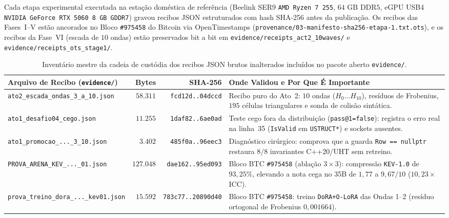 \documentclass[10pt,a4paper]{article}
\begin{document}
Cada etapa experimental executada na esta\c{c}\~ao dom\'estica de refer\^encia (Beelink SER9 \texttt{AMD Ryzen 7 255}, $64\text{ GB DDR5}$, eGPU USB4 \texttt{NVIDIA GeForce RTX 5060 8 GB GDDR7}) gravou recibos JSON estruturados com hash SHA-256 antes da publica\c{c}\~ao. Os recibos das Fases~I--V est\~ao ancorados no Bloco \texttt{\#975458} do Bitcoin via OpenTimestamps (\texttt{provenance/03-manifesto-\allowbreak{}sha256-\allowbreak{}etapa-1.txt.ots}), e os recibos da Fase~VI (escada de $10$ ondas) est\~ao preservados bit a bit em \texttt{evidence/receipts\_\allowbreak{}act2\_\allowbreak{}10waves/} e \texttt{evidence/receipts\_\allowbreak{}ots\_\allowbreak{}stage1/}.

\begin{table}[!htbp]
\centering
\caption{Invent\'ario mestre da cadeia de cust\'odia dos recibos JSON brutos inalterados inclu\'idos no pacote aberto \texttt{evidence/}.}
\label{tab:receipts_pt}
\footnotesize
\begin{tabularx}{\linewidth}{@{}lrrY@{}}
\toprule
\textbf{Arquivo de Recibo (\texttt{evidence/})} & \textbf{Bytes} & \textbf{SHA-256} & \textbf{Onde Validou e Por Que \'E Importante} \\
\midrule
\texttt{ato2\_\allowbreak{}escada\_\allowbreak{}ondas\_\allowbreak{}3\_\allowbreak{}a\_\allowbreak{}10.json} & $58.311$ & \texttt{fcd12d..04dccd} & Recibo puro do Ato~2: $10$ ondas ($H_0\dots H_{10}$), res\'iduos de Frobenius, $195$ c\'elulas triangulares e sonda de colis\~ao sint\'atica. \\
\texttt{ato1\_\allowbreak{}desafio04\_\allowbreak{}cego.json} & $11.255$ & \texttt{1daf82..6ae0ad} & Teste cego fora da distribui\c{c}\~ao (\texttt{pass@1=false}): registra o erro real na linha~35 (\texttt{IsValid} em \texttt{USTRUCT*}) e sockets ausentes. \\
\texttt{ato1\_\allowbreak{}promocao\_\allowbreak{}...\_\allowbreak{}3\_\allowbreak{}10.json} & $3.402$ & \texttt{485f0a..96eec3} & Diagn\'ostico cir\'urgico: comprova que a guarda \texttt{Row == nullptr} restaura $8/8$ invariantes C++20/UHT sem retreino. \\
\texttt{PROVA\_\allowbreak{}ARENA\_\allowbreak{}KEV\_\allowbreak{}...\_\allowbreak{}01.json} & $127.048$ & \texttt{dae162..95ed093} & Bloco BTC \texttt{\#975458} (abla\c{c}\~ao $3\times 3$): compress\~ao \texttt{KEV-1.0} de $93,25\%$, elevando a nota cega no 35B de $1,77$ a $9,67/10$ ($10,23\times$ $\text{ICC}$). \\
\texttt{prova\_\allowbreak{}treino\_\allowbreak{}dora\_\allowbreak{}...\_\allowbreak{}kev01.json} & $15.592$ & \texttt{783c77..20890d40} & Bloco BTC \texttt{\#975458}: treino \texttt{DoRA+O-LoRA} das Ondas 1--2 (res\'iduo ortogonal de Frobenius $0,001664$). \\

\end{tabularx}
\end{table}
\end{document}
